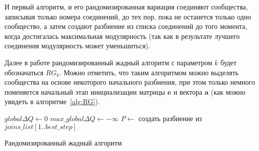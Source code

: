 И первый алгоритм, и его рандомизированная вариация соединяют сообщества, записывая только номера соединений, до тех пор, пока не останется только одно сообщество, а затем создают разбиение из списка соединений до того момента, когда достигалась максимальная модулярность (так как в результате лучшего соединения модулярность может уменьшиться). 

Далее в работе рандомизированный жадный алгоритм с параметром $k$ будет обозначаться $RG_k$.
Можно отметить, что таким алгоритмом можно выделять сообщества на основе некоторого начального разбиения, при этом только немного поменяется начальный этап инициализации матрицы $\mathbf{e}$ и вектора $\mathbf{a}$ (как можно увидеть в алгоритме~\ref{alg:RG}).\\

\begin{algorithm}[H]
\SetAlgoLined
{}
\BlankLine
$global\Delta Q \leftarrow 0$\;
$max\_global\Delta Q \leftarrow -\infty$\;
\BlankLine
$P \leftarrow $ создать разбиение из $joins\_list[1..best\_step]$\;
\BlankLine
\caption{Рандомизированный жадный алгоритм}
\label{alg:RG}
\end{algorithm}

\vspace{0.1cm}

